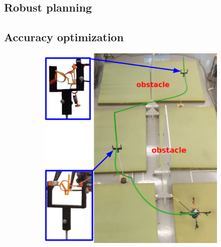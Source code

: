 \subsection{Robust planning} \label{sec:RobustPlanExp}

\subsection{Accuracy optimization} \label{sec:AccOptExp}

\begin{figure} [t]
    \begin{subfigure}{0.63\linewidth}
      \includegraphics[width=\linewidth]{figures/robust_accurate/ring_opti_v1.png}
    \end{subfigure}\hfill
    \begin{subfigure}{0.37\linewidth}

\end{subfigure}
\end{figure}
